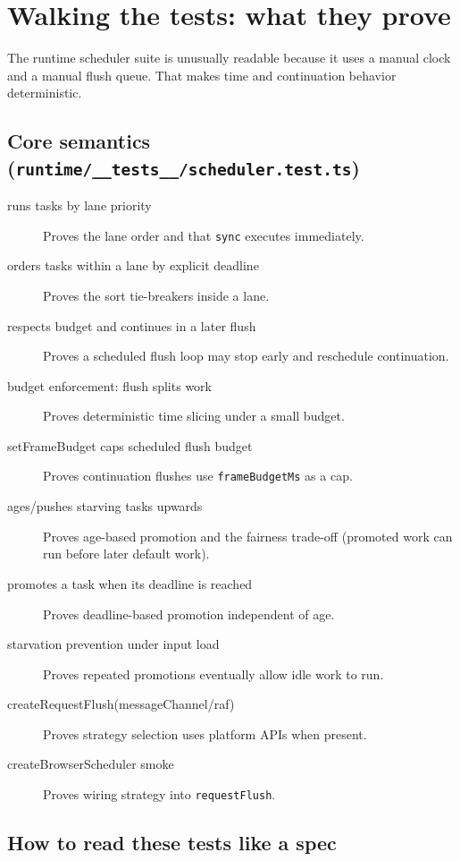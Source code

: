 \section{Walking the tests: what they prove}

The runtime scheduler suite is unusually readable because it uses a manual clock and a manual flush queue.
That makes time and continuation behavior deterministic.

\subsection{Core semantics (\texttt{runtime/\_\_tests\_\_/scheduler.test.ts})}

\begin{description}
  \item[runs tasks by lane priority] Proves the lane order and that \texttt{sync} executes immediately.
  \item[orders tasks within a lane by explicit deadline] Proves the sort tie-breakers inside a lane.
  \item[respects budget and continues in a later flush] Proves a scheduled flush loop may stop early and reschedule continuation.
  \item[budget enforcement: flush splits work] Proves deterministic time slicing under a small budget.
  \item[setFrameBudget caps scheduled flush budget] Proves continuation flushes use \texttt{frameBudgetMs} as a cap.
  \item[ages/pushes starving tasks upwards] Proves age-based promotion and the fairness trade-off (promoted work can run before later default work).
  \item[promotes a task when its deadline is reached] Proves deadline-based promotion independent of age.
  \item[starvation prevention under input load] Proves repeated promotions eventually allow idle work to run.
  \item[createRequestFlush(messageChannel/raf)] Proves strategy selection uses platform APIs when present.
  \item[createBrowserScheduler smoke] Proves wiring strategy into \texttt{requestFlush}.
\end{description}

\subsection{How to read these tests like a spec}


